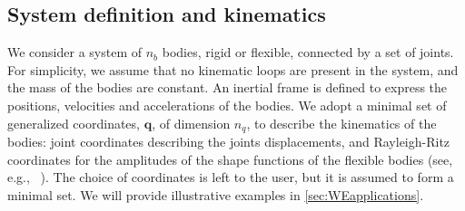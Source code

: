 \documentclass[wes, manuscript]{copernicus}
\renewcommand{\v}[1]{\boldsymbol{#1}}
\begin{document}
\subsection{System definition and kinematics}
We consider a system of $n_b$ bodies, rigid or flexible, connected by a set of joints.
    For simplicity, we assume that no kinematic loops are present in the system, and the mass of the bodies are constant.
    An inertial frame is defined to express the positions, velocities and accelerations of the bodies.
    We adopt a minimal set of generalized coordinates, $\v{q}$, of dimension $n_q$, to describe the kinematics of the bodies: joint coordinates describing the joints displacements, and Rayleigh-Ritz coordinates for the amplitudes of the shape functions of the flexible bodies (see, e.g., ~\cite{branlard:2019flex}).
The choice of coordinates is left to the user, but it is assumed to form a minimal set.
We will provide illustrative examples in \autoref{sec:WEapplications}.
\end{document}
